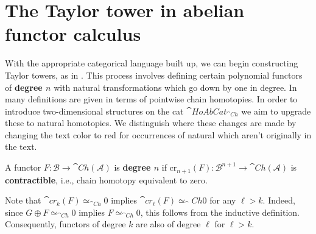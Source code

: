 \section{The Taylor tower in abelian functor calculus}

With the appropriate categorical language built up, we can begin constructing Taylor towers, as in \cite{JohnsonB.2004Dcwc}. This process involves defining certain polynomial functors of \textbf{degree $n$} with natural transformations which go down by one in degree. In \cite{BJORT} many definitions are given in terms of pointwise chain homotopies. In order to introduce two-dimensional structures on the cat $\cat{HoAbCat}_{\cat{Ch}}$ we aim to upgrade these to natural homotopies. We distinguish where these changes are made by changing the text color to red for occurrences of natural which aren't originally in the text.

\begin{defn}[label=defn:4.1]{}
    A functor $F:\mathcal{B}\rightarrow \cat{Ch}(\mathcal{A})$ is \textbf{degree $n$} if $\text{cr}_{n+1}(F):\mathcal{B}^{n+1}\rightarrow \cat{Ch}(\mathcal{A})$ is \textbf{contractible}, i.e.,  chain homotopy equivalent to zero. 
\end{defn}

Note that $\cat{cr}_k(F) \simeq_{\cat{Ch}} 0$ implies $\cat{cr}_\ell(F) \simeq_\cat{Ch} 0$ for any $\ell > k$. Indeed, since $G \oplus F \simeq_{\cat{Ch}} 0$ implies $F \simeq_{\cat{Ch}} 0$, this follows from the inductive definition. Consequently, functors of degree $k$ are also of degree $\ell$ for $\ell > k$.

